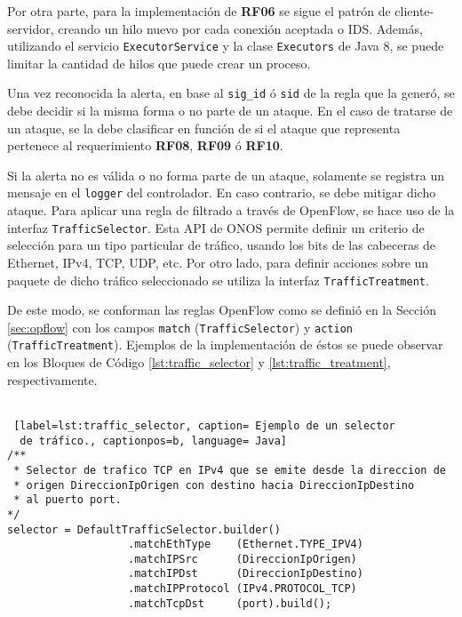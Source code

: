 Por otra parte, para la implementación de \textbf{RF06} se sigue el patrón de
cliente-servidor, creando un hilo nuevo por cada conexión aceptada o IDS.
Además, utilizando el servicio \verb|ExecutorService| y la clase
\verb|Executors| de Java 8, se puede limitar la cantidad de hilos que puede
crear un proceso.

Una vez reconocida la alerta, en base al \verb|sig_id| ó \verb|sid| de la regla
que la generó, se debe decidir si la misma forma o no parte de un ataque. En el
caso de tratarse de un ataque, se la debe clasificar en función de si el ataque
que representa pertenece al requerimiento \textbf{RF08}, \textbf{RF09} ó
\textbf{RF10}.

Si la alerta no es válida o no forma parte de un ataque, solamente se registra
un mensaje en el \verb|logger| del controlador. En caso contrario, se debe
mitigar dicho ataque. Para aplicar una regla de filtrado a través de OpenFlow,
se hace uso de la interfaz \verb|TrafficSelector|. Esta API de ONOS permite
definir un criterio de selección para un tipo particular de tráfico, usando los
bits de las cabeceras de Ethernet, IPv4, TCP, UDP, etc. Por otro lado, para
definir acciones sobre un paquete de dicho tráfico seleccionado se utiliza la
interfaz \verb|TrafficTreatment|.

De este modo, se conforman las reglas OpenFlow como se definió en la Sección
\ref{sec:opflow} con los campos \verb|match| (\verb|TrafficSelector|) y
\verb|action| (\verb|TrafficTreatment|). Ejemplos de la implementación de éstos
se puede observar en los Bloques de Código \ref{lst:traffic_selector} y
\ref{lst:traffic_treatment}, respectivamente.\\ \\

\begin{lstlisting} [label=lst:traffic_selector, caption= Ejemplo de un selector
  de tráfico., captionpos=b, language= Java]
/**
 * Selector de trafico TCP en IPv4 que se emite desde la direccion de
 * origen DireccionIpOrigen con destino hacia DireccionIpDestino 
 * al puerto port.
*/
selector = DefaultTrafficSelector.builder()
                   .matchEthType    (Ethernet.TYPE_IPV4)
                   .matchIPSrc      (DireccionIpOrigen)
                   .matchIPDst      (DireccionIpDestino)
                   .matchIPProtocol (IPv4.PROTOCOL_TCP)
                   .matchTcpDst     (port).build();
\end{lstlisting}

